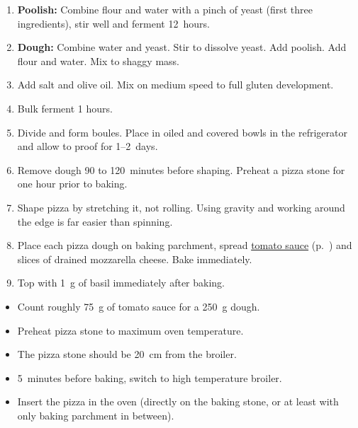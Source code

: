 \begin{recipe}
  \begin{enumerate}

  \item \textbf{Poolish:} Combine flour and water with a pinch of
    yeast (first three ingredients), stir well and ferment 12~hours.

  \item \textbf{Dough:} Combine water and yeast.  Stir to dissolve
    yeast.  Add poolish.  Add flour and water.  Mix to shaggy mass.

  \item Add salt and olive oil.  Mix on medium speed to full gluten
    development.

  \item Bulk ferment 1\fracH{} hours.

  \item Divide and form boules.  Place in oiled and covered bowls in
    the refrigerator and allow to proof for 1--2~days.

  \item Remove dough 90 to 120~minutes before shaping.  Preheat a
    pizza stone for one hour prior to baking.

  \item Shape pizza by stretching it, not rolling.  Using gravity and
    working around the edge is far easier than spinning.

  \item Place each pizza dough on baking parchment, spread
    \hyperref[tomato.sauce]{tomato sauce} (p.~\pageref{tomato.sauce})
    and slices of drained mozzarella cheese.  Bake immediately.

  \item Top with 1~g of basil immediately after baking.

  \end{enumerate}
\end{recipe}

\notes
\begin{itemize}
\item Count roughly 75~g of tomato sauce for a 250~g dough.
\item Preheat pizza stone to maximum oven temperature.
\item The pizza stone should be 20~cm from the broiler.
\item 5~minutes before baking, switch to high temperature broiler.
\item Insert the pizza in the oven (directly on the baking stone, or
  at least with only baking parchment in between).
\end{itemize}
